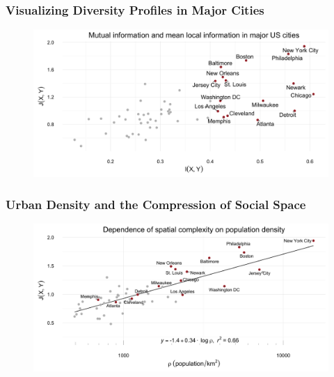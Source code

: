 \documentclass{beamer}
\begin{document}
	\begin{frame}\frametitle{Visualizing Diversity Profiles in Major Cities}
		\centering
		\begin{figure}
	    	\centering
	    	\includegraphics[width=\textwidth]{figs/mutual_fisher.png}
	    \end{figure}
	\end{frame}
	\iflong
	\begin{frame}\frametitle{Urban Density and the Compression of Social Space}
		\centering
		\begin{figure}
	    	\centering
	    	\includegraphics[width=\textwidth]{figs/density_fisher.png}
	    \end{figure}
	\end{frame}
	\fi

\end{document}
